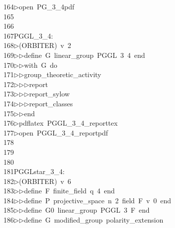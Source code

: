 \begin{tabbing}
164\>$\triangleright$\>open\ PG\_3\_4pdf\\[0pt]
165\>\\[0pt]
166\>\\[0pt]
167\>PGGL\_3\_4:\\[0pt]
168\>$\triangleright$\>(ORBITER)\ v\ 2\ \\[0pt]
169\>$\triangleright$\>$\triangleright$\>define\ G\ linear\_group\ PGGL\ 3\ 4\ end\ \\[0pt]
170\>$\triangleright$\>$\triangleright$\>with\ G\ do\ \\[0pt]
171\>$\triangleright$\>$\triangleright$\>group\_theoretic\_activity\ \\[0pt]
172\>$\triangleright$\>$\triangleright$\>$\triangleright$\>report\ \\[0pt]
173\>$\triangleright$\>$\triangleright$\>$\triangleright$\>report\_sylow\ \\[0pt]
174\>$\triangleright$\>$\triangleright$\>$\triangleright$\>report\_classes\ \\[0pt]
175\>$\triangleright$\>$\triangleright$\>end\\[0pt]
176\>$\triangleright$\>pdflatex\ PGGL\_3\_4\_reporttex\\[0pt]
177\>$\triangleright$\>open\ PGGL\_3\_4\_reportpdf\\[0pt]
178\>\\[0pt]
179\>\\[0pt]
180\>\\[0pt]
181\>PGGLstar\_3\_4:\\[0pt]
182\>$\triangleright$\>(ORBITER)\ v\ 6\ \\[0pt]
183\>$\triangleright$\>$\triangleright$\>define\ F\ finite\_field\ q\ 4\ end\ \\[0pt]
184\>$\triangleright$\>$\triangleright$\>define\ P\ projective\_space\ n\ 2\ field\ F\ v\ 0\ end\ \\[0pt]
185\>$\triangleright$\>$\triangleright$\>define\ G0\ linear\_group\ PGGL\ 3\ F\ end\ \\[0pt]
186\>$\triangleright$\>$\triangleright$\>define\ G\ modified\_group\ polarity\_extension\ \\[0pt]

\end{tabbing}
